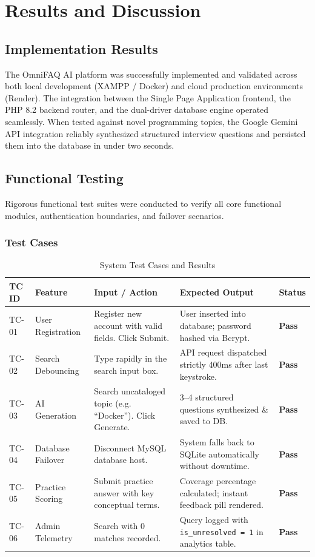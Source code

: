\chapter{Results and Discussion}

\section{Implementation Results}
The OmniFAQ AI platform was successfully implemented and validated across both local development (XAMPP / Docker) and cloud production environments (Render). The integration between the Single Page Application frontend, the PHP 8.2 backend router, and the dual-driver database engine operated seamlessly. When tested against novel programming topics, the Google Gemini API integration reliably synthesized structured interview questions and persisted them into the database in under two seconds.

\section{Functional Testing}
Rigorous functional test suites were conducted to verify all core functional modules, authentication boundaries, and failover scenarios.

\subsection{Test Cases}

\begin{table}[h!]
\centering
\caption{System Test Cases and Results}
\label{tab:testcases}
\begin{tabular}{@{}p{1.2cm}p{3cm}p{3.5cm}p{3.8cm}p{1.5cm}@{}}
\toprule
\textbf{TC ID} & \textbf{Feature} & \textbf{Input / Action} & \textbf{Expected Output} & \textbf{Status} \\ \midrule
TC-01 & User Registration & Register new account with valid fields. Click Submit. & User inserted into database; password hashed via Bcrypt. & \textbf{Pass} \\
TC-02 & Search Debouncing & Type rapidly in the search input box. & API request dispatched strictly 400ms after last keystroke. & \textbf{Pass} \\
TC-03 & AI Generation & Search uncataloged topic (e.g. ``Docker''). Click Generate. & 3--4 structured questions synthesized \& saved to DB. & \textbf{Pass} \\
TC-04 & Database Failover & Disconnect MySQL database host. & System falls back to SQLite automatically without downtime. & \textbf{Pass} \\
TC-05 & Practice Scoring & Submit practice answer with key conceptual terms. & Coverage percentage calculated; instant feedback pill rendered. & \textbf{Pass} \\
TC-06 & Admin Telemetry & Search with 0 matches recorded. & Query logged with \texttt{is\_unresolved = 1} in analytics table. & \textbf{Pass} \\
\bottomrule
\end{tabular}
\end{table}

